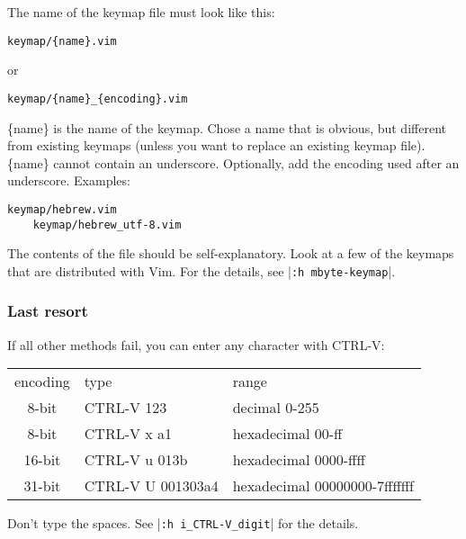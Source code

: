 The name of the keymap file must look like this:

\begin{Verbatim}[samepage=true]
    keymap/{name}.vim 
\end{Verbatim}
or
\begin{Verbatim}[samepage=true]
    keymap/{name}_{encoding}.vim 
\end{Verbatim}

\{name\} is the name of the keymap.
Chose a name that is obvious, but different from existing keymaps (unless you want to replace an existing keymap file).
\{name\} cannot contain an underscore.
Optionally, add the encoding used after an underscore.
Examples:

\begin{Verbatim}[samepage=true]
    keymap/hebrew.vim 
    keymap/hebrew_utf-8.vim 
\end{Verbatim}

The contents of the file should be self-explanatory.
Look at a few of the keymaps that are distributed with Vim.
For the details, see |\verb!:h mbyte-keymap!|.

\subsubsection{Last resort}
If all other methods fail, you can enter any character with CTRL-V:

\begin{center} \begin{tabular}{c l l}
				encoding & type & range \\
				8-bit & CTRL-V 123 & decimal 0-255 \\
				8-bit & CTRL-V x a1 & hexadecimal 00-ff \\
				16-bit & CTRL-V u 013b & hexadecimal 0000-ffff \\
				31-bit & CTRL-V U 001303a4 & hexadecimal 00000000-7fffffff \\
\end{tabular} \end{center}

Don't type the spaces.
See |\verb!:h i_CTRL-V_digit!| for the details.
\clearpage
